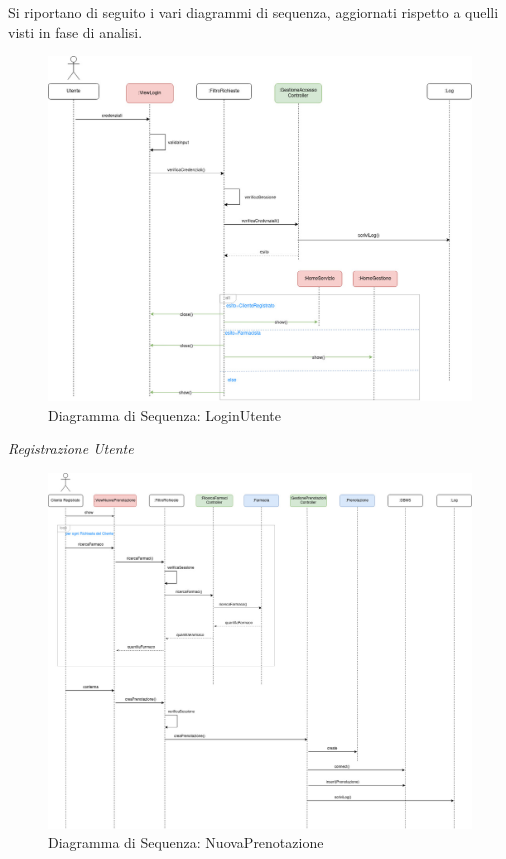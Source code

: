 Si riportano di seguito i vari diagrammi di sequenza, aggiornati rispetto a quelli visti in fase di analisi.

\vspace{3em}

\begin{figure}[h!]
    \begin{center}
        \includegraphics[width=\textwidth]{immagini/Interazione-LoginUtente-progettaz.jpg}
        \caption{Diagramma di Sequenza: LoginUtente}
    \end{center}
\end{figure}

\newpage

\textit{Registrazione Utente}

\newpage

\begin{figure}[h!]
    \begin{center}
        \includegraphics[width=\textwidth]{immagini/Interazione-NuovaPrenotazione-progettaz.jpg}
        \caption{Diagramma di Sequenza: NuovaPrenotazione}
    \end{center}
\end{figure}

